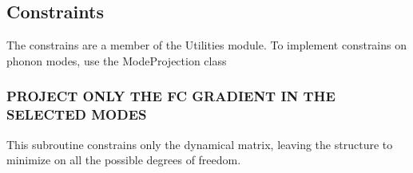 \documentclass[a4paper,11pt,english]{sphinxmanual}
\begin{document}
\subsection{Constraints}
\label{\detokenize{apireference:constraints}}
\sphinxAtStartPar
The constrains are a member of the Utilities module.
To implement constrains on phonon modes, use the ModeProjection class

\begin{fulllineitems}
\label{\detokenize{apireference:sscha.Utilities.ModeProjection}}
\pysigstartsignatures
{}
\pysigstopsignatures{}

\begin{fulllineitems}
\label{\detokenize{apireference:sscha.Utilities.ModeProjection.CFG_ProjectDyn}}
\pysigstartsignatures
{}
\pysigstopsignatures

\subsubsection{PROJECT ONLY THE FC GRADIENT IN THE SELECTED MODES}
\label{\detokenize{apireference:project-only-the-fc-gradient-in-the-selected-modes}}
\sphinxAtStartPar
This subroutine constrains only the dynamical matrix, leaving the structure
to minimize on all the possible degrees of freedom.

\end{fulllineitems}


\begin{fulllineitems}
\label{\detokenize{apireference:sscha.Utilities.ModeProjection.CFG_ProjectOnModes}}
\pysigstartsignatures
{}
\pysigstopsignatures


\end{fulllineitems}
\end{fulllineitems}
\end{document}
